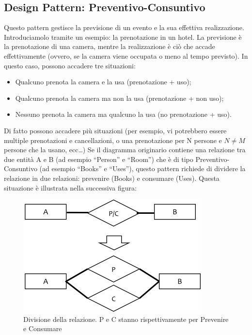 \subsection{Design Pattern: Preventivo-Consuntivo}

Questo pattern gestisce la previsione di un evento e la sua effettiva realizzazione. Introduciamolo tramite un esempio: la prenotazione in un hotel. La previsione è la prenotazione di una camera, mentre la realizzazione è ciò che accade effettivamente (ovvero, se la camera viene occupata o meno al tempo previsto). In questo caso, possono accadere tre situazioni: 

\begin{itemize}

\item Qualcuno prenota la camera e la usa (prenotazione + uso);
\item Qualcuno prenota la camera ma non la usa (prenotazione + non uso);
\item Nessuno prenota la camera ma qualcuno la usa (no prenotazione + uso).

\end{itemize}

Di fatto possono accadere più situazioni (per esempio, vi potrebbero essere multiple prenotazioni e cancellazioni, o una prenotazione per N persone e $N \neq M$ persone che la usano, ecc…) Se il diagramma originario contiene una relazione tra due entità A e B (ad esempio “Person” e “Room”) che è di tipo Preventivo-Consuntivo (ad esempio “Books” e “Uses”), questo pattern richiede di dividere la relazione in due relazioni: prevenire (Books) e consumare (Uses). Questa situazione è illustrata nella successiva figura:

\begin{center}
\begin{figure}[H]
\centering
\includegraphics[scale=1]{figures/prevcon.png}
\caption{ Divisione della relazione. P e C stanno rispettivamente per Prevenire e Consumare} 
\end{figure}
\end{center}

